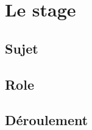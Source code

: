 \documentclass[../rapport.tex]{subfiles}
\begin{document}
    \chapter{Le stage}
    \section{Sujet}
    \section{Role}
    \section{Déroulement}
\end{document}
